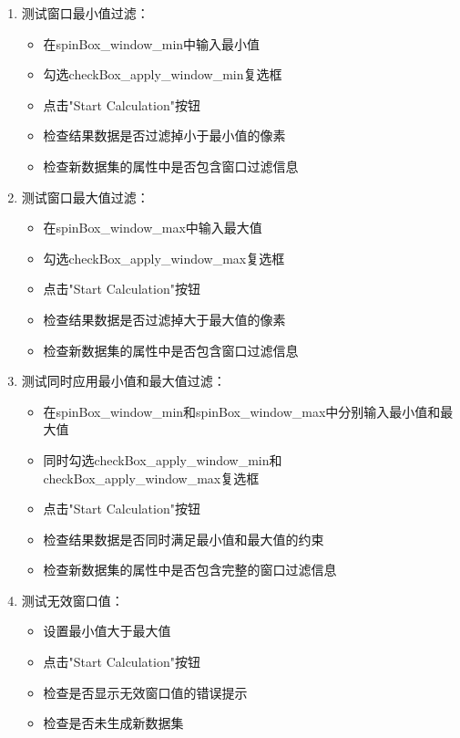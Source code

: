 \documentclass[a4paper,12pt]{report}	%
\begin{document}
\begin{enumerate}
    \item 测试窗口最小值过滤：
    \begin{itemize}
        \item 在spinBox\_window\_min中输入最小值
        \item 勾选checkBox\_apply\_window\_min复选框
        \item 点击"Start Calculation"按钮
        \item 检查结果数据是否过滤掉小于最小值的像素
        \item 检查新数据集的属性中是否包含窗口过滤信息
    \end{itemize}

    \item 测试窗口最大值过滤：
    \begin{itemize}
        \item 在spinBox\_window\_max中输入最大值
        \item 勾选checkBox\_apply\_window\_max复选框
        \item 点击"Start Calculation"按钮
        \item 检查结果数据是否过滤掉大于最大值的像素
        \item 检查新数据集的属性中是否包含窗口过滤信息
    \end{itemize}

    \item 测试同时应用最小值和最大值过滤：
    \begin{itemize}
        \item 在spinBox\_window\_min和spinBox\_window\_max中分别输入最小值和最大值
        \item 同时勾选checkBox\_apply\_window\_min和checkBox\_apply\_window\_max复选框
        \item 点击"Start Calculation"按钮
        \item 检查结果数据是否同时满足最小值和最大值的约束
        \item 检查新数据集的属性中是否包含完整的窗口过滤信息
    \end{itemize}

    \item 测试无效窗口值：
    \begin{itemize}
        \item 设置最小值大于最大值
        \item 点击"Start Calculation"按钮
        \item 检查是否显示无效窗口值的错误提示
        \item 检查是否未生成新数据集
    \end{itemize}


\end{enumerate}
\end{document}
